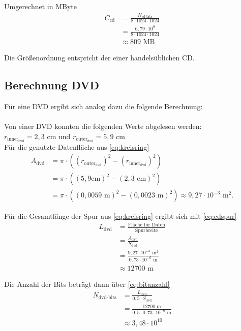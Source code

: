 \documentclass[9pt,twocolumn,twoside]{pnas-new}
\begin{document}
Umgerechnet in MByte
\begin{align*}
C_{\mbox{cd}} &= \frac{N_{\mbox{cd-bits}}}{8\cdot1024\cdot1024}\\
&= \frac{ 6,79\cdot10^9}{8\cdot1024\cdot1024}\\
&\approx 809\mbox{ MB}
\end{align*}

Die Größenordnung entspricht der einer handelsüblichen CD.

\subsection{Berechnung DVD}
Für eine DVD ergibt sich analog dazu die folgende Berechnung: \\ \\
Von einer DVD konnten die folgenden Werte abgelesen werden: \begin{math} r_{\mbox{inner}_{\mbox{dvd}}} = 2,3 \mbox{ cm und } r_{\mbox{outer}_{\mbox{dvd}}} = 5,9 \mbox{ cm} \end{math} \\

Für die genutzte Datenfläche aus \eqref{eq:kreisring}
\begin{align*}
 A_{\mbox{dvd}} &= \pi\cdot((r_{\mbox{outer}_{\mbox{dvd}}})^2-(r_{\mbox{inner}_{\mbox{dvd}}})^2)  \\	
&= \pi\cdot((5,9\mbox{cm})^2-(2,3\mbox{ cm})^2) \\
 &=  \pi\cdot((0,0059\mbox{ m})^2-(0,0023\mbox{ m})^2) \approx 9,27\cdot10^{-3}\mbox{ m}^2.
\end{align*}

Für die Gesamtlänge der Spur aus \eqref{eq:kreisring} ergibt sich mit \eqref{eq:cdspur}
\begin{align*}
 L_{\mbox{dvd}} &= \frac{\mbox{Fläche für Daten}}{\mbox{Spurbreite}}\\
 &= \frac{A_{\mbox{dvd}}}{S_{\mbox{dvd}}}\\
 &= \frac{9,27\cdot10^{-3}\mbox{ m}^2}{0,73\cdot10^{-6}\mbox{ m} }\\
 &\approx 12700\mbox{ m}
\end{align*}

Die Anzahl der Bits beträgt dann über \eqref{eq:bitanzahl}
\begin{align*}
N_{\mbox{dvd-bits}} &=  \frac{L_{\mbox{dvd}}}{0,5\cdot S_{\mbox{dvd}}}\\
&= \frac{12700\mbox{ m}}{0,5\cdot 0,73\cdot10^{-6}\mbox{ m}}\\
&\approx 3,48\cdot 10^{10}
\end{align*}
\end{document}
